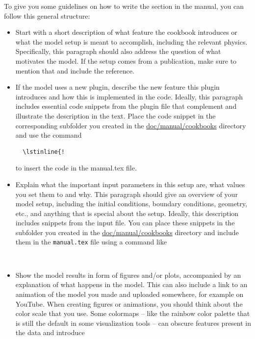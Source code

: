 \documentclass{article}
\begin{document}
To give you some guidelines on how to write the section in the manual, you can follow this general structure:
\begin{itemize}
\item Start with a short description of what feature the cookbook introduces or what
  the model setup is meant to accomplish, including the relevant physics. 
  Specifically, this paragraph should also address the question of what motivates the model. 
  If the setup comes from a publication, make sure to mention that and include the reference.
\item If the model uses a new plugin, describe the new feature this plugin introduces
  and how this is implemented in the code. Ideally, this paragraph includes essential code
  snippets from the plugin file that complement and illustrate the description in the text.
  Place the code snippet in the corresponding subfolder you created in the
  \href{doc/manual/cookbooks/.}{doc/manual/cookbooks} directory and
  use the command 
  \begin{verbatim}
  \lstinline{!
  \end{verbatim}
  to insert the code in the manual.tex file.
\item Explain what the important input parameters in this setup are, what values you
  set them to and why. This paragraph should give an overview of your model setup, 
  including the initial conditions, boundary conditions, geometry, etc., and anything that 
  is special about the setup. Ideally, this description includes snippets from
  the input file. You can place these snippets in the subfolder you created in the
  \href{doc/manual/cookbooks/.}{doc/manual/cookbooks}
  directory and include them in the \texttt{manual.tex} file using a command like
  \begin{verbatim}
  
  \end{verbatim}
\item Show the model results in form of figures and/or plots, accompanied by an explanation
  of what happens in the model. This can also include a link to an animation of the model
  you made and uploaded somewhere, for example on YouTube.
  When creating figures or animations, you should think about the color scale that you use. 
  Some colormaps -- like the rainbow color palette that is still the default in some 
  visualization tools -- can obscure features present in the data and introduce 

\end{itemize}
\end{document}
